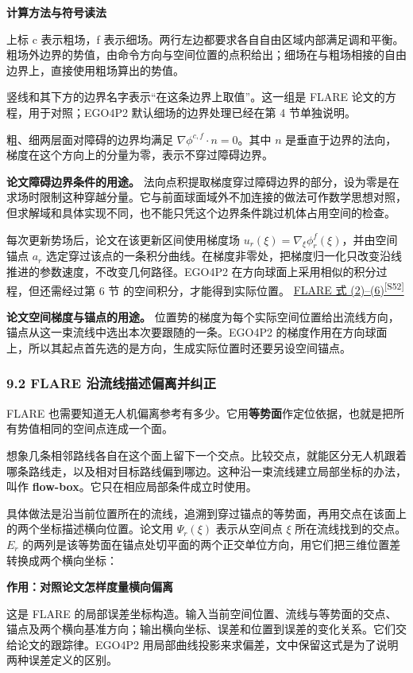 \documentclass[12pt,a4paper]{article}
\numberwithin{equation}{topic}
\newcommand{\sourceref}[2]{\hyperlink{source-#1}{#2\textsuperscript{[#1]}}}
\begin{document}
\noindent\textbf{计算方法与符号读法}\par\nobreak
上标 c 表示粗场，f 表示细场。两行左边都要求各自自由区域内部满足调和平衡。粗场外边界的势值，由命令方向与空间位置的点积给出；细场在与粗场相接的自由边界上，直接使用粗场算出的势值。

竖线和其下方的边界名字表示“在这条边界上取值”。这一组是 FLARE 论文的方程，用于对照；EGO4P2 默认细场的边界处理已经在第 4 节单独说明。


粗、细两层面对障碍的边界均满足 \(\nabla\phi^{c,f}\cdot n=0\)。其中 \(n\) 是垂直于边界的法向，梯度在这个方向上的分量为零，表示不穿过障碍边界。

\textbf{论文障碍边界条件的用途。} 法向点积提取梯度穿过障碍边界的部分，设为零是在求场时限制这种穿越分量。它与前面球面域外不加连接的做法可作数学思想对照，但求解域和具体实现不同，也不能只凭这个边界条件跳过机体占用空间的检查。

每次更新势场后，论文在该更新区间使用梯度场 \(u_r(\xi)=\nabla_\xi\phi_r^f(\xi)\)，并由空间锚点 \(a_r\) 选定穿过该点的一条积分曲线。在梯度非零处，把梯度归一化只改变沿线推进的参数速度，不改变几何路径。EGO4P2 在方向球面上采用相似的积分过程，但还需经过第 6 节 的空间积分，才能得到实际位置。 \sourceref{S52}{FLARE 式 (2)–(6)}

\textbf{论文空间梯度与锚点的用途。} 位置势的梯度为每个实际空间位置给出流线方向，锚点从这一束流线中选出本次要跟随的一条。EGO4P2 的梯度作用在方向球面上，所以其起点首先选的是方向，生成实际位置时还要另设空间锚点。

\subsubsection*{9.2 FLARE 沿流线描述偏离并纠正}

FLARE 也需要知道无人机偏离参考有多少。它用\textbf{等势面}作定位依据，也就是把所有势值相同的空间点连成一个面。

想象几条相邻路线各自在这个面上留下一个交点。比较交点，就能区分无人机跟着哪条路线走，以及相对目标路线偏到哪边。这种沿一束流线建立局部坐标的办法，叫作 \textbf{flow-box}。它只在相应局部条件成立时使用。

具体做法是沿当前位置所在的流线，追溯到穿过锚点的等势面，再用交点在该面上的两个坐标描述横向位置。论文用 \(\Psi_r(\xi)\) 表示从空间点 \(\xi\) 所在流线找到的交点。\(E_r\) 的两列是该等势面在锚点处切平面的两个正交单位方向，用它们把三维位置差转换成两个横向坐标：

\noindent\textbf{作用：对照论文怎样度量横向偏离}\par\nobreak
这是 FLARE 的局部误差坐标构造。输入当前空间位置、流线与等势面的交点、锚点及两个横向基准方向；输出横向坐标、误差和位置到误差的变化关系。它们交给论文的跟踪律。EGO4P2 用局部曲线投影来求偏差，文中保留这式是为了说明两种误差定义的区别。
\end{document}

